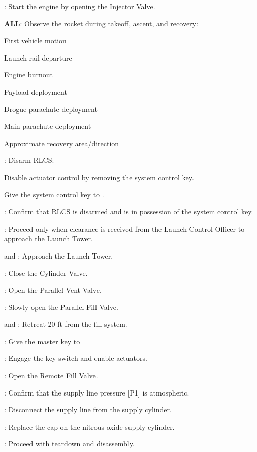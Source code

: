 \begin{checklist}
\begin{checklist}
\begin{checklist}[label=$\bullet$]
\begin{checklist}
            \end{checklist}
        \end{checklist}
        \item \primary: Start the engine by opening the Injector Valve.
    \end{checklist}
    \item \textbf{ALL}: Observe the rocket during takeoff, ascent, and recovery:
    \begin{checklist}
        \item First vehicle motion
        \item Launch rail departure
        \item Engine burnout
        \item Payload deployment
        \item Drogue parachute deployment
        \item Main parachute deployment
        \item Approximate recovery area/direction
    \end{checklist}
    \item \control{}: Disarm RLCS:
    \begin{checklist}
        \item Disable actuator control by removing the system control key.
        \item Give the system control key to \ops{}.
    \end{checklist}
    \item \ops: Confirm that RLCS is disarmed and \ops{} is in possession of the system control  key.
    \item \ops{}: Proceed only when clearance is received from the Launch Control Officer to approach the Launch Tower.
    \item \primary{} and \secondary: Approach the Launch Tower.
    \item \primary{}: Close the Cylinder Valve.
    \item \primary{}: Open the Parallel Vent Valve.
    \item \primary{}: Slowly open the Parallel Fill Valve.
    \item \primary{} and \secondary: Retreat 20 ft from the fill system.
    \item \ops: Give the master key to \control{}
    \item \control{}: Engage the key switch and enable actuators.
    \item \control{}: Open the Remote Fill Valve.
    \item \control{}: Confirm that the supply line pressure [P1] is atmospheric.
    \item \primary{}: Disconnect the supply line from the supply cylinder.
    \item \primary{}: Replace the cap on the nitrous oxide supply cylinder.
    \item \ops{}: Proceed with teardown and disassembly.
\end{checklist}
\setcounter{checklistnum}{0}

